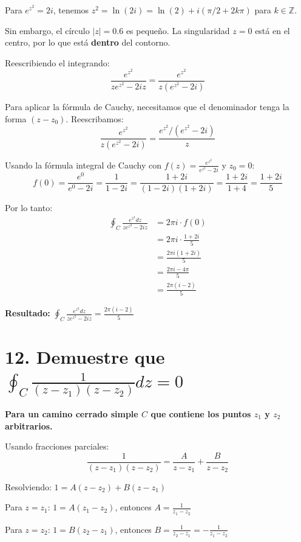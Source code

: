 \documentclass{article}
\begin{document}
Para $e^{z^2} = 2i$, tenemos $z^2 = \ln(2i) = \ln(2) + i(\pi/2 + 2k\pi)$ para $k \in \mathbb{Z}$.

Sin embargo, el círculo $|z| = 0.6$ es pequeño. La singularidad $z = 0$ está en el centro, por lo que está \textbf{dentro} del contorno.

Reescribiendo el integrando:
$$\frac{e^{z^2}}{z e^{z^2} - 2iz} = \frac{e^{z^2}}{z(e^{z^2} - 2i)}$$

Para aplicar la fórmula de Cauchy, necesitamos que el denominador tenga la forma $(z - z_0)$. Reescribamos:
$$\frac{e^{z^2}}{z(e^{z^2} - 2i)} = \frac{e^{z^2}/(e^{z^2} - 2i)}{z}$$

Usando la fórmula integral de Cauchy con $f(z) = \frac{e^{z^2}}{e^{z^2} - 2i}$ y $z_0 = 0$:
$$f(0) = \frac{e^{0}}{e^{0} - 2i} = \frac{1}{1 - 2i} = \frac{1 + 2i}{(1 - 2i)(1 + 2i)} = \frac{1 + 2i}{1 + 4} = \frac{1 + 2i}{5}$$

Por lo tanto:
\begin{align*}
\oint_C \frac{e^{z^2} dz}{z e^{z^2} - 2iz} &= 2\pi i \cdot f(0) \\
                                           &= 2\pi i \cdot \frac{1 + 2i}{5} \\
                                           &= \frac{2\pi i(1 + 2i)}{5} \\
                                           &= \frac{2\pi i - 4\pi}{5} \\
                                           &= \frac{2\pi(i - 2)}{5}
\end{align*}

\textbf{Resultado:} $\oint_C \frac{e^{z^2} dz}{z e^{z^2} - 2iz} = \frac{2\pi(i - 2)}{5}$

\newpage
\section*{12. Demuestre que $\oint_C \frac{1}{(z - z_1)(z - z_2)} dz = 0$}

\textbf{Para un camino cerrado simple $C$ que contiene los puntos $z_1$ y $z_2$ arbitrarios.}

Usando fracciones parciales:
$$\frac{1}{(z - z_1)(z - z_2)} = \frac{A}{z - z_1} + \frac{B}{z - z_2}$$

Resolviendo: $1 = A(z - z_2) + B(z - z_1)$

Para $z = z_1$: $1 = A(z_1 - z_2)$, entonces $A = \frac{1}{z_1 - z_2}$

Para $z = z_2$: $1 = B(z_2 - z_1)$, entonces $B = \frac{1}{z_2 - z_1} = -\frac{1}{z_1 - z_2}$
\end{document}
